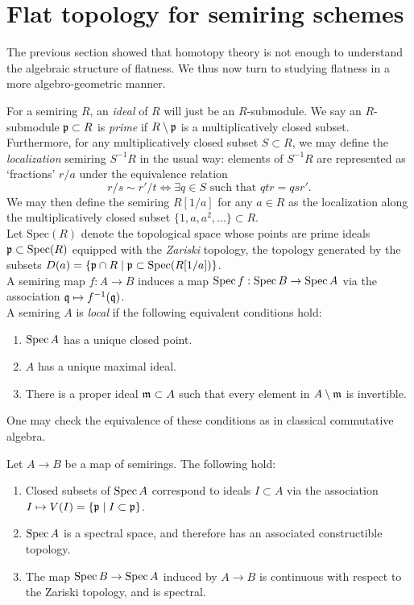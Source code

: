 \section{Flat topology for semiring schemes}
The previous section showed that homotopy theory is not enough to understand the algebraic structure of flatness. We thus now
turn to studying flatness in a more algebro-geometric manner. 
\begin{definition}
For a semiring $R$, an \textit{ideal} of $R$ will just be an $R$-submodule. We say an $R$-submodule $\mathfrak{p} \subset R$ is \textit{prime} if $R \setminus \mathfrak{p}$ is a multiplicatively closed subset. 
Furthermore, for any multiplicatively closed subset $S \subset R$, we may define the 
\textit{localization} semiring $S^{-1}R$ in the usual way: elements of $S^{-1}R$ are represented as `fractions' $r/a$ 
under the equivalence relation 
\[r/s \sim r'/t \Longleftrightarrow \exists q \in S \text{ such that } qtr = qsr'.\]
We may then define the semiring $R[1/a]$ for any $a \in R$ as the localization along the multiplicatively closed subset $\{1,a,a^2,...\} \subset R$.\\
\indent Let $\text{Spec}(R)$ denote the topological space whose points are prime ideals $\mathfrak{p} \subset \text{Spec}(R)$ equipped with the \textit{Zariski} topology, 
the topology generated by the subsets $D(a) = \{\mathfrak{p} \cap R \; | \; \mathfrak{p} \subset \text{Spec}(R[1/a])\}$.\\
\indent A semiring map $f: A \to B$ induces a map $\operatorname{Spec}{f}: \operatorname{Spec}{B} \rightarrow \operatorname{Spec}{A}$ via the association $\mathfrak{q} \mapsto f^{-1}(\mathfrak{q})$.\\
\indent A semiring $A$ is \textit{local} if the following equivalent conditions hold:
\begin{enumerate}
\item[(a)] $\operatorname{Spec}{A}$ has a unique closed point.
\item[(b)] $A$ has a unique maximal ideal.
\item[(c)] There is a proper ideal $\mathfrak{m} \subset A$ such that every element in $A \setminus \mathfrak{m}$ is invertible.
\end{enumerate}
One may check the equivalence of these conditions as in classical commutative algebra.
\end{definition}
\begin{proposition}\label{prop:spec}
Let $A\to B$ be a map of semirings. The following hold:
\begin{enumerate}
\item[(i)] Closed subsets of $\operatorname{Spec}{A}$ correspond to ideals $I \subset A$ via the association $I \mapsto V(I) = \{\mathfrak{p} \; | \; I \subset \mathfrak{p}\}$.
\item[(ii)] $\operatorname{Spec}{A}$ is a spectral space, and therefore has an associated constructible topology.
\item[(iii)] The map $\operatorname{Spec}{B} \rightarrow \operatorname{Spec}{A}$ induced by $A \to B$ is continuous with respect to the Zariski topology, and is spectral.
\end{enumerate}
\end{proposition}

